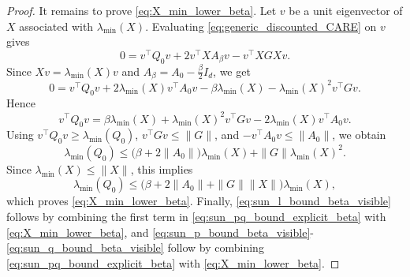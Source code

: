 \documentclass[a4paper, 10pt, english, reqno]{amsart}
\begin{document}
\begin{proof}
    It remains to prove \eqref{eq:X_min_lower_beta}. Let $v$ be a unit
    eigenvector of $X$ associated with $\lambda_{\min}(X)$. Evaluating
    \eqref{eq:generic_discounted_CARE} on $v$ gives
    \[
        0
        =
        v^\top Q_0v
        +
        2v^\top XA_\beta v
        -
        v^\top XGXv.
    \]
    Since $Xv=\lambda_{\min}(X)v$ and
    $A_\beta=A_0-\frac{\beta}{2}I_d$, we get
    \[
        0
        =
        v^\top Q_0v
        +
        2\lambda_{\min}(X)v^\top A_0v
        -
        \beta\lambda_{\min}(X)
        -
        \lambda_{\min}(X)^2v^\top Gv.
    \]
    Hence
    \[
        v^\top Q_0v
        =
        \beta\lambda_{\min}(X)
        +
        \lambda_{\min}(X)^2v^\top Gv
        -
        2\lambda_{\min}(X)v^\top A_0v.
    \]
    Using $v^\top Q_0v\ge\lambda_{\min}(Q_0)$,
    $v^\top Gv\le\|G\|$, and $-v^\top A_0v\le\|A_0\|$, we obtain
    \[
        \lambda_{\min}(Q_0)
        \le
        \bigl(\beta+2\|A_0\|\bigr)\lambda_{\min}(X)
        +
        \|G\|\lambda_{\min}(X)^2.
    \]
    Since $\lambda_{\min}(X)\le\|X\|$, this implies
    \[
        \lambda_{\min}(Q_0)
        \le
        \bigl(\beta+2\|A_0\|+\|G\|\|X\|\bigr)
        \lambda_{\min}(X),
    \]
    which proves \eqref{eq:X_min_lower_beta}. Finally,
    \eqref{eq:sun_l_bound_beta_visible} follows by combining the first term in 
    \eqref{eq:sun_pq_bound_explicit_beta} with
    \eqref{eq:X_min_lower_beta}, and
    \eqref{eq:sun_p_bound_beta_visible}-\eqref{eq:sun_q_bound_beta_visible}
    follow by combining \eqref{eq:sun_pq_bound_explicit_beta} with
    \eqref{eq:X_min_lower_beta}.
    \end{proof}
    
\end{document}
